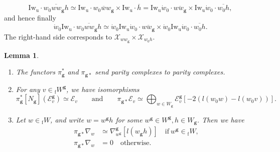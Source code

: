 \documentclass[11pt]{amsart}
\theoremstyle{plain}
\newtheorem{lem}[thm]{Lemma}
\theoremstyle{remark}
\numberwithin{equation}{section}
\begin{document}
	$$\mathrm{Iw}_{\mathrm{u}}\cdot\overline{w_0ww_\mathbf{g}h}\simeq \mathrm{Iw}_{\mathrm{u}}\cdot\overline{w_0ww_\mathbf{g}}\times \mathrm{Iw}_{\mathrm{u}}\cdot\overline{h}= \mathrm{Iw}_{\mathrm{u}}\dot{w}_0\cdot\overline{ww_\mathbf{g}}\times \mathrm{Iw}_{\mathrm{u}}\dot{w}_0\cdot\overline{w_0h},$$
	and hence finally
		$$\dot{w}_0\mathrm{Iw}_{\mathrm{u}}\cdot\overline{w_0ww_\mathbf{g}h}\simeq \dot{w}_0\mathrm{Iw}_{\mathrm{u}}\dot{w}_0\cdot\overline{ww_\mathbf{g}}\times \dot{w}_0\mathrm{Iw}_{\mathrm{u}}\dot{w}_0\cdot\overline{w_0h}.$$
	The right-hand side corresponds to $\mathscr{X}_{ww_\mathbf{g}}\times \mathscr{X}_{w_0h}$.
	\begin{lem}
		\label{lem1}
		\begin{enumerate}
			\item The functors $\pi_{\mathbf{g}}^*$ and $\pi_{{\mathbf{g}}*}$ send parity complexes to parity complexes.
			\item For any $v\in {_\mathrm{f}W}^\mathbf{g}$, we have isomorphisms
			$$\pi_{\mathbf{g}}^*[N_{\mathbf{g}}](\mathcal{E}_v^\mathbf{g})\simeq \mathcal{E}_v\qquad\text{and}\qquad\pi_{\mathbf{g}*}\mathcal{E}_v\simeq \bigoplus_{w\in W_\mathbf{g}}\mathcal{E}_v^\mathbf{g}[-2(l(w_0w)-l(w_0v))].$$
			\item Let $w\in{_\mathrm{f}W}$, and write $w=w^{\mathbf{g}}h$ for some  $w^{\mathbf{g}}\in W^{\mathbf{g}},h\in W_{\mathbf{g}}$. Then we have 
			\begin{align*}
				\pi_{\mathbf{g}*}\nabla_w&\simeq\nabla^{\mathbf{g}}_{w^{\mathbf{g}}}[l(w_\mathbf{g}h)]\quad\text{if}~w^{\mathbf{g}}\in{_\mathrm{f}W},\\
				\pi_{\mathbf{g}*}\nabla_w&=0\quad\text{otherwise.}
			\end{align*}
		\end{enumerate}
	\end{lem}
\end{document}

